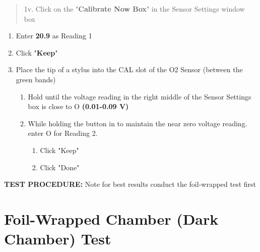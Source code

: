 \documentclass[
  letterpaper,
  DIV=11,
  numbers=noendperiod]{scrreprt}
\begin{document}
\begin{quote}
1v. Click on the "\textbf{Calibrate Now Box}" in the Sensor Settings
window box
\end{quote}

\begin{enumerate}
\def\labelenumi{\alph{enumi}.}
\item
  Enter \textbf{20.9} as Reading 1
\item
  Click "\textbf{Keep}"
\item
  Place the tip of a stylus into the CAL slot of the O2 Sensor (between
  the green bands)

  \begin{enumerate}
  \def\labelenumii{\roman{enumii}.}
  \item
    Hold until the voltage reading in the right middle of the Sensor
    Settings box is close to O \textbf{(0.01-0.09 V)}
  \item
    While holding the button in to maintain the near zero voltage
    reading. enter O for Reading 2.

    \begin{enumerate}
    \def\labelenumiii{\arabic{enumiii}.}
    \item
      Click "Keep"
    \item
      Click "Done"
    \end{enumerate}
  \end{enumerate}
\end{enumerate}

\textbf{TEST PROCEDURE:} Note for best results conduct the foil-wrapped
test first

\section{\texorpdfstring{\textbf{Foil-Wrapped Chamber (Dark Chamber)
Test}}{Foil-Wrapped Chamber (Dark Chamber) Test}}\label{foil-wrapped-chamber-dark-chamber-test}
\end{document}
